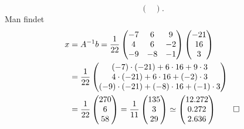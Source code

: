\begin{loesung}
\begin{teilaufgaben}
\[\begin{pmatrix}
\end{pmatrix}.
\]
Man findet
\begin{align*}
x&
=
A^{-1}b=
\frac1{22}
\begin{pmatrix}
-7&  6& 9\\
 4&  6&-2\\
-9&- 8&-1
\end{pmatrix}
\begin{pmatrix}
-21\\16\\3
\end{pmatrix}
\\
&=
\frac1{22}
\begin{pmatrix}
(-7)\cdot(-21)+6\cdot 16+9\cdot 3\\
4\cdot (-21)+ 6\cdot 16+ (-2)\cdot 3\\
(-9)\cdot(-21)+ (-8)\cdot 16+ (-1)\cdot 3
\end{pmatrix}
\\
&
=
\frac1{22}
\begin{pmatrix}
270\\
6\\
58
\end{pmatrix}
=
\frac1{11}
\begin{pmatrix}
135\\
3\\
29
\end{pmatrix}
\simeq
\begin{pmatrix}
   12.272\\
    0.272\\
    2.636
\end{pmatrix}
\qedhere
\end{align*}
\end{teilaufgaben}
\end{loesung}
